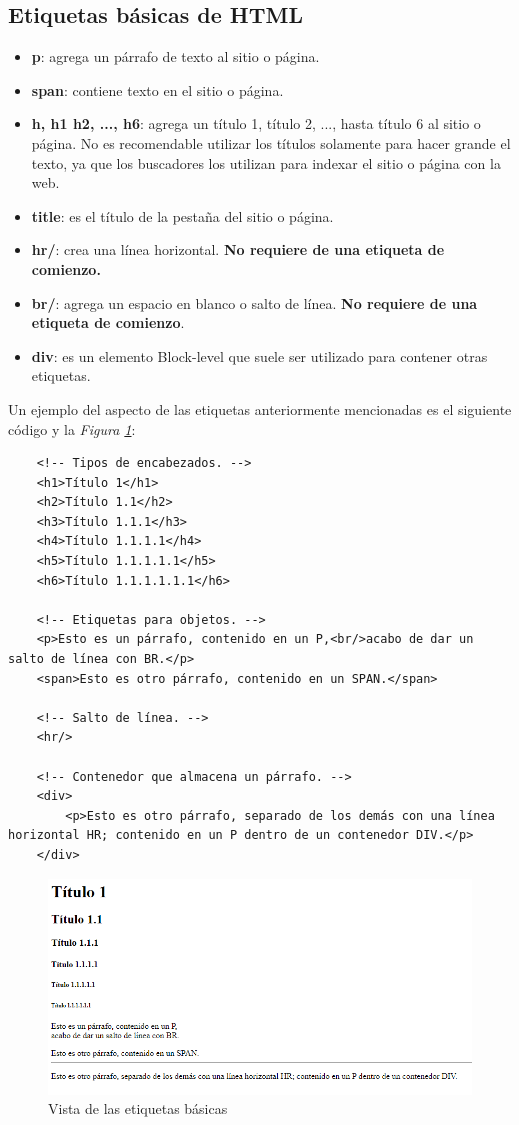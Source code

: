 \subsection{Etiquetas básicas de HTML}
\begin{itemize}
    \item \textbf{p}: agrega un párrafo de texto al sitio o página.
    \item \textbf{span}: contiene texto en el sitio o página.
    \item \textbf{h, h1 h2, ..., h6}: agrega un título 1, título 2, ..., hasta título 6 al sitio o página. No es recomendable utilizar los títulos solamente para hacer grande el texto, ya que los buscadores los utilizan para indexar el sitio o página con la web.
    \item \textbf{title}: es el título de la pestaña del sitio o página.
    \item \textbf{hr/}: crea una línea horizontal. \textbf{No requiere de una etiqueta de comienzo.}
    \item \textbf{br/}: agrega un espacio en blanco o salto de línea. \textbf{No requiere de una etiqueta de comienzo}.
    \item \textbf{div}: es un elemento Block-level que suele ser utilizado para contener otras etiquetas.
\end{itemize}

Un ejemplo del aspecto de las etiquetas anteriormente mencionadas es el siguiente código y la \textit{Figura \ref{fig: 1}}:
\begin{lstlisting}
    <!-- Tipos de encabezados. -->
    <h1>Título 1</h1>
    <h2>Título 1.1</h2>
    <h3>Título 1.1.1</h3>
    <h4>Título 1.1.1.1</h4>
    <h5>Título 1.1.1.1.1</h5>
    <h6>Título 1.1.1.1.1.1</h6>

    <!-- Etiquetas para objetos. -->
    <p>Esto es un párrafo, contenido en un P,<br/>acabo de dar un salto de línea con BR.</p>
    <span>Esto es otro párrafo, contenido en un SPAN.</span>
    
    <!-- Salto de línea. -->
    <hr/>
    
    <!-- Contenedor que almacena un párrafo. -->
    <div>
        <p>Esto es otro párrafo, separado de los demás con una línea horizontal HR; contenido en un P dentro de un contenedor DIV.</p>
    </div>
\end{lstlisting}
\begin{figure}[H]
    \centering
    \caption{Vista de las etiquetas básicas}
    \label{fig: 1}
    \includegraphics[width=12cm]{ss_html/etiquetas_basicas.png}
\end{figure}


